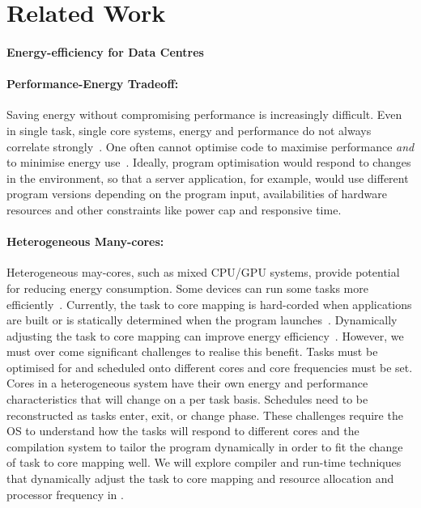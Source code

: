 \section{Related Work}
\paragraph{Energy-efficiency for Data Centres}


\paragraph{Performance-Energy Tradeoff:} Saving energy without compromising
performance is increasingly difficult. Even in single task, single
core systems, energy and performance do not always correlate strongly~\cite{}. 
One often cannot optimise code to maximise
performance \emph{and} to minimise energy
use~\cite{Esmaeilzadeh:2012:LBL:2209249.2209272}. Ideally, program optimisation
 would respond to changes in the environment, so that a server application, for
example, would use different program versions depending on the program input, 
availabilities of hardware resources and other constraints like power cap and
responsive time. 

\paragraph{Heterogeneous Many-cores:} Heterogeneous may-cores, such as mixed CPU/GPU systems,
provide potential for
reducing energy consumption. Some devices can run some tasks more
efficiently~\cite{Cong:2012}. Currently, the task to core mapping is
hard-corded when applications are built or is statically
determined when the program launches~\cite{cc11grewe}. Dynamically adjusting
the task to core mapping can improve energy efficiency~\cite{4550857}. However,
we must over come significant challenges to realise this benefit. Tasks must
be optimised for and scheduled onto different cores and core frequencies must
be set. Cores in a heterogeneous system have their own energy and performance
characteristics that will change on a per task basis. Schedules need to be
reconstructed as tasks enter, exit, or change phase. These challenges require
the OS to understand how the tasks will respond to different cores and the
compilation system to tailor the program dynamically in order to fit the
change of task to core mapping well. We will explore compiler and run-time
techniques that dynamically adjust the task to core mapping and resource
allocation and processor frequency in .


